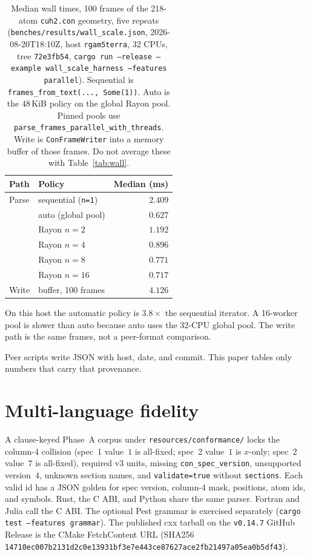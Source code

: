\documentclass[preprint,12pt]{elsarticle}
\begin{document}
\begin{table}[ht]
\centering
\caption{Median wall times, 100 frames of the 218-atom
\texttt{cuh2.con} geometry, five repeats
(\texttt{benches/results/wall\_scale.json}, 2026-08-20T18:10Z, host
\texttt{rgam5terra}, 32 CPUs, tree \texttt{72e3fb54},
\texttt{cargo run --release --example wall\_scale\_harness
--features parallel}). Sequential is
\texttt{frames\_from\_text(..., Some(1))}. Auto is the $48$\,KiB
policy on the global Rayon pool. Pinned pools use
\texttt{parse\_frames\_parallel\_with\_threads}. Write is
\texttt{ConFrameWriter} into a memory buffer of those frames. Do
not average these with Table~\ref{tab:wall}.}
\label{tab:io}
\begin{tabular}{@{}llr@{}}
\toprule
Path & Policy & Median (ms) \\
\midrule
Parse & sequential (\texttt{n=1}) & $2.409$ \\
 & auto (global pool) & $0.627$ \\
 & Rayon $n=2$ & $1.192$ \\
 & Rayon $n=4$ & $0.896$ \\
 & Rayon $n=8$ & $0.771$ \\
 & Rayon $n=16$ & $0.717$ \\
\midrule
Write & buffer, 100 frames & $4.126$ \\
\bottomrule
\end{tabular}
\end{table}

On this host the automatic policy is $3.8\times$ the sequential
iterator. A 16-worker pool is slower than auto because auto uses
the 32-CPU global pool. The write path is the same frames, not a
peer-format comparison.

Peer scripts write JSON with host, date, and commit. This paper
tables only numbers that carry that provenance.

\section{Multi-language fidelity}

A clause-keyed Phase~A corpus under
\texttt{resources/conformance/} locks the column-4 collision (spec~1
value~$1$ is all-fixed; spec~2 value~$1$ is $x$-only; spec~2
value~$7$ is all-fixed), required v3 units, missing
\texttt{con\_spec\_version}, unsupported version~$4$, unknown
section names, and \texttt{validate=true} without
\texttt{sections}. Each valid id has a JSON golden for spec
version, column-4 mask, positions, atom ids, and symbols. Rust, the
C ABI, and Python share the same parser. Fortran and Julia call the
C ABI. The optional Pest grammar is exercised separately
(\texttt{cargo test --features grammar}).
The published cxx tarball on the \texttt{v0.14.7} GitHub Release is
the CMake FetchContent URL (SHA256
\texttt{14710ec007b2131d2c0e13931bf3e7e443ce87627ace2fb21497a05ea0b5df43}).
\end{document}
